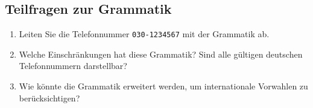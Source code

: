 \documentclass[a4paper,12pt]{article}
\begin{document}
	\subsection*{Teilfragen zur Grammatik}
	\begin{enumerate}
		\item Leiten Sie die Telefonnummer \texttt{030-1234567} mit der Grammatik ab.
		\item Welche Einschränkungen hat diese Grammatik? Sind alle gültigen deutschen Telefonnummern darstellbar?
		\item Wie könnte die Grammatik erweitert werden, um internationale Vorwahlen zu berücksichtigen?
	\end{enumerate}
	
\end{document}
